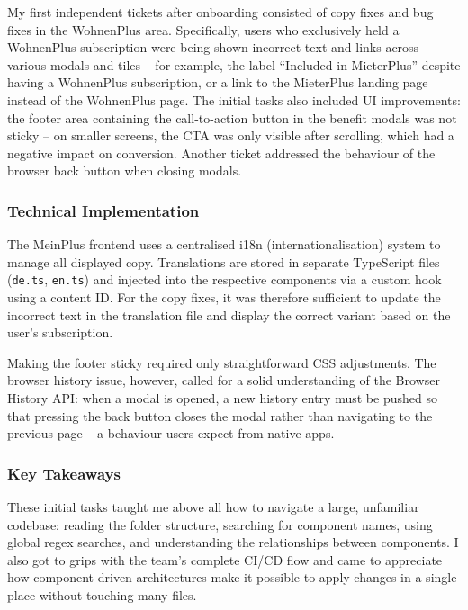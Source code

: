 \documentclass[a4paper, 12pt]{article}
\begin{document}
My first independent tickets after onboarding consisted of copy fixes and bug fixes in
the WohnenPlus area. Specifically, users who exclusively held a WohnenPlus subscription
were being shown incorrect text and links across various modals and tiles -- for
example, the label \enquote{Included in MieterPlus} despite having a WohnenPlus
subscription, or a link to the MieterPlus landing page instead of the WohnenPlus page.
The initial tasks also included UI improvements: the footer area containing the
call-to-action button in the benefit modals was not sticky -- on smaller screens, the
CTA was only visible after scrolling, which had a negative impact on conversion.
Another ticket addressed the behaviour of the browser back button when closing modals.

\subsubsection*{Technical Implementation}

The MeinPlus frontend uses a centralised i18n (internationalisation) system to manage
all displayed copy. Translations are stored in separate TypeScript files
(\texttt{de.ts}, \texttt{en.ts}) and injected into the respective components via a
custom hook using a content ID. For the copy fixes, it was therefore sufficient to
update the incorrect text in the translation file and display the correct variant based
on the user's subscription.

Making the footer sticky required only straightforward CSS adjustments. The browser
history issue, however, called for a solid understanding of the Browser History API:
when a modal is opened, a new history entry must be pushed so that pressing the back
button closes the modal rather than navigating to the previous page -- a behaviour
users expect from native apps.

\subsubsection*{Key Takeaways}

These initial tasks taught me above all how to navigate a large, unfamiliar codebase:
reading the folder structure, searching for component names, using global regex searches,
and understanding the relationships between components. I also got to grips with the
team's complete CI/CD flow and came to appreciate how component-driven architectures
make it possible to apply changes in a single place without touching many files.
\end{document}

